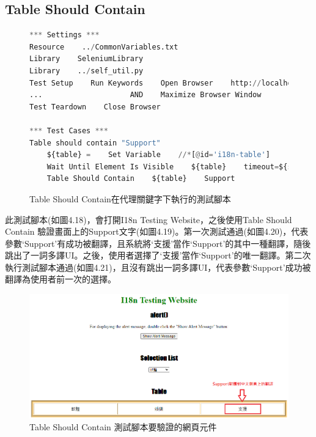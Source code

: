 \subsection{Table Should Contain}
\begin{figure}[H]
\begin{lstlisting}[language={python}]
*** Settings ***
Resource    ../CommonVariables.txt
Library    SeleniumLibrary
Library    ../self_util.py
Test Setup    Run Keywords    Open Browser    http://localhost:3000    Chrome
...                    AND    Maximize Browser Window
Test Teardown    Close Browser

*** Test Cases ***
Table should contain "Support"
    ${table} =    Set Variable    //*[@id='i18n-table']
    Wait Until Element Is Visible    ${table}    timeout=${shortPeriodOfTime}
    Table Should Contain    ${table}    Support
\end{lstlisting}
\caption{Table Should Contain在代理關鍵字下執行的測試腳本}
\end{figure}
此測試腳本(如圖4.18)，會打開I18n Testing Website，之後使用Table Should Contain 驗證畫面上的Support文字(如圖4.19)。第一次測試通過(如圖4.20)，代表參數‘Support’有成功被翻譯，且系統將‘支援’當作‘Support’的其中一種翻譯，隨後跳出了一詞多譯UI。之後，使用者選擇了‘支援’當作‘Support’的唯一翻譯。第二次執行測試腳本通過(如圖4.21)，且沒有跳出一詞多譯UI，代表參數‘Support’成功被翻譯為使用者前一次的選擇。

\begin{figure}[H]
\includegraphics[width= \textwidth]{../論文截圖/4-1-13 Table should contain要驗證的網頁元件.png}
\caption{Table Should Contain 測試腳本要驗證的網頁元件}
\end{figure}

